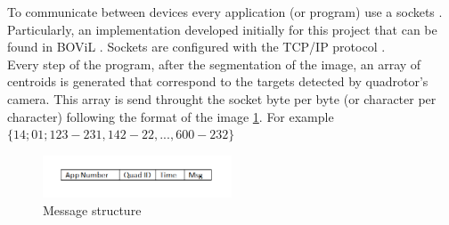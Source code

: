 To communicate between devices every application (or program) use a sockets \cite{SocketWiki}. Particularly, an implementation developed initially for this project that can be found in BOViL \cite{BOViL}. Sockets are configured with the TCP/IP protocol \cite{TCPIP}. \\
Every step of the program, after the segmentation of the image, an array of centroids is generated that correspond to the targets detected by quadrotor's camera. This array is send throught the socket byte per byte (or character per character) following the format of the image \ref{fig:message_structure}. For example $\{14;01;123-231,142-22,...,600-232\}$

\begin{figure}[h] 
	\centering
		\includegraphics[width=0.50\textwidth]{../Images/c2/message_structure.png}
	\caption{Message structure}
	\label{fig:message_structure}
\end{figure}


